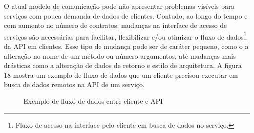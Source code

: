 O atual modelo de comunicação pode não apresentar problemas visíveis para serviços com pouca demanda de dados de clientes. Contudo, ao longo do tempo e com aumento no número de contratos, mudanças na interface de acesso de serviços são necessárias para facilitar, flexibilizar e/ou otimizar o fluxo de dados\footnote{
  Fluxo de acesso na interface pelo cliente em busca de dados no serviço.
} da API em clientes. Esse tipo de mudança pode ser de caráter pequeno, como o a alteração no nome de um método ou número argumentos, até mudanças mais drásticas como a alteração de dados de retorno e estilo de arquitetura. A figura 18 mostra um exemplo de fluxo de dados que um cliente precisou executar em busca de dados remotos na API de um serviço.

\begin{figure}[H]
  \centering
  \caption{Exemplo de fluxo de dados entre cliente e API}
\end{figure}


